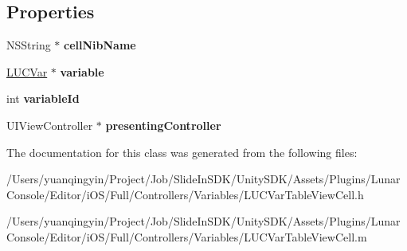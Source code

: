 \subsection*{Properties}
\begin{DoxyCompactItemize}
\item 
\mbox{\label{interface_l_u_c_var_table_view_cell_adebf4a08f615848a1f2fe52f55a7c2bb}} 
N\+S\+String $\ast$ {\bfseries cell\+Nib\+Name}
\item 
\mbox{\label{interface_l_u_c_var_table_view_cell_af50b0f735cb2563fe3195ef7cfc79375}} 
\mbox{\hyperlink{interface_l_u_c_var}{L\+U\+C\+Var}} $\ast$ {\bfseries variable}
\item 
\mbox{\label{interface_l_u_c_var_table_view_cell_a0d6d50cccd81940f6b6ca07c79622614}} 
int {\bfseries variable\+Id}
\item 
\mbox{\label{interface_l_u_c_var_table_view_cell_af118dc206126515f4ee4f1ba6acc88a0}} 
U\+I\+View\+Controller $\ast$ {\bfseries presenting\+Controller}
\end{DoxyCompactItemize}


The documentation for this class was generated from the following files\+:\begin{DoxyCompactItemize}
\item 
/\+Users/yuanqingyin/\+Project/\+Job/\+Slide\+In\+S\+D\+K/\+Unity\+S\+D\+K/\+Assets/\+Plugins/\+Lunar\+Console/\+Editor/i\+O\+S/\+Full/\+Controllers/\+Variables/L\+U\+C\+Var\+Table\+View\+Cell.\+h\item 
/\+Users/yuanqingyin/\+Project/\+Job/\+Slide\+In\+S\+D\+K/\+Unity\+S\+D\+K/\+Assets/\+Plugins/\+Lunar\+Console/\+Editor/i\+O\+S/\+Full/\+Controllers/\+Variables/L\+U\+C\+Var\+Table\+View\+Cell.\+m\end{DoxyCompactItemize}
